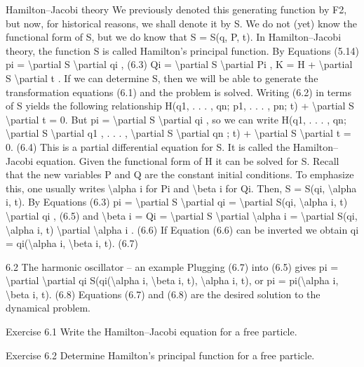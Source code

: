 Hamilton--Jacobi theory
We previously denoted this generating function by F2, but now, for historical
reasons, we shall denote it by S. We do not (yet) know the functional form of
S, but we do know that
S = S(q, P, t).
In Hamilton--Jacobi theory, the function S is called Hamilton's principal
function.
By Equations (5.14)
pi = \textbackslash{}partial S
\textbackslash{}partial qi
,
(6.3)
Qi = \textbackslash{}partial S
\textbackslash{}partial Pi
,
K = H + \textbackslash{}partial S
\textbackslash{}partial t .
If we can determine S, then we will be able to generate the transformation
equations (6.1) and the problem is solved.
Writing (6.2) in terms of S yields the following relationship
H(q1, . . . , qn; p1, . . . , pn; t) + \textbackslash{}partial S
\textbackslash{}partial t = 0.
But pi = \textbackslash{}partial S
\textbackslash{}partial qi , so we can write
H(q1, . . . , qn; \textbackslash{}partial S
\textbackslash{}partial q1
, . . . , \textbackslash{}partial S
\textbackslash{}partial qn
; t) + \textbackslash{}partial S
\textbackslash{}partial t = 0.
(6.4)
This is a partial differential equation for S. It is called the Hamilton--Jacobi
equation. Given the functional form of H it can be solved for S.
Recall that the new variables P and Q are the constant initial conditions. To
emphasize this, one usually writes \textbackslash{}alpha i for Pi and \textbackslash{}beta i for Qi. Then,
S = S(qi, \textbackslash{}alpha i, t).
By Equations (6.3)
pi = \textbackslash{}partial S
\textbackslash{}partial qi
= \textbackslash{}partial S(qi, \textbackslash{}alpha i, t)
\textbackslash{}partial qi
,
(6.5)
and
\textbackslash{}beta i = Qi = \textbackslash{}partial S
\textbackslash{}partial \textbackslash{}alpha i
= \textbackslash{}partial S(qi, \textbackslash{}alpha i, t)
\textbackslash{}partial \textbackslash{}alpha i
.
(6.6)
If Equation (6.6) can be inverted we obtain
qi = qi(\textbackslash{}alpha i, \textbackslash{}beta i, t).
(6.7)

6.2
The harmonic oscillator -- an example
Plugging (6.7) into (6.5) gives
pi =
\textbackslash{}partial
\textbackslash{}partial qi
S(qi(\textbackslash{}alpha i, \textbackslash{}beta i, t), \textbackslash{}alpha i, t),
or
pi = pi(\textbackslash{}alpha i, \textbackslash{}beta i, t).
(6.8)
Equations (6.7) and (6.8) are the desired solution to the dynamical
problem.
\begin{exercise}
Exercise 6.1 Write the Hamilton--Jacobi equation for a free particle.
\end{exercise}

\begin{exercise}
Exercise 6.2 Determine Hamilton's principal function for a free particle.
\end{exercise}

